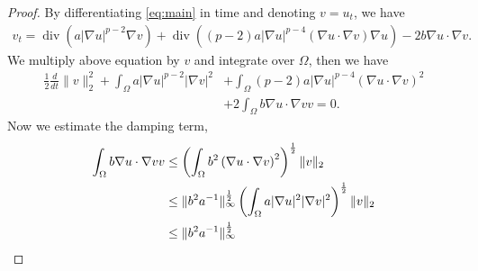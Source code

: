 \documentclass[11pt]{amsart}
\theoremstyle{definition}
\newtheorem{proofpart}{part}
\numberwithin{equation}{section}
\newcommand*\abs[1]{\lvert#1\rvert}
\newcommand*\norm[1]{\lVert#1\rVert}
\newcommand*\Brace[1]{\lbrace#1\rbrace}
\newcommand\R{\mathbb{R}}
\DeclareMathOperator{\Div}{div}
\begin{document}
\begin{proof}
	By differentiating \cref{eq:main} in time and denoting $v = u_t$, we have
	\begin{equation}
		\begin{split}
			v_t
			= \Div\left(a\abs{\nabla u}^{p-2}\nabla v\right)
			+ \Div\left(\left(p-2\right)a \abs{\nabla u}^{p-4}\left(\nabla u \cdot \nabla v\right)\nabla u\right)
			- 2b\nabla u \cdot \nabla v.
		\end{split}
	\end{equation}
	We multiply above equation by $v$ and integrate over $\Omega$, then we have
	\begin{equation}
		\begin{split}
			\frac{1}{2}\frac{d}{dt}\norm{v}_2^2
			+ \int_{\Omega}a\abs{\nabla u}^{p-2}\abs{\nabla v}^2
			&+ \int_{\Omega}\left(p-2\right)a\abs{\nabla u}^{p-4}\left(\nabla u
			\cdot \nabla v\right)^2\\
			&+ 2\int_{\Omega}b\nabla u \cdot \nabla v v
			= 0.
		\end{split}
	\end{equation}
	Now we estimate the damping term,
	\begin{equation}
		\begin{split}
			\int_{\Omega}b\nabla u \cdot \nabla v v
			&\leq \left(\int_{\Omega}b^2\left(\nabla u
			\cdot \nabla v\right)^2\right)^{\frac{1}{2}}
			\*\norm{v}_2\\
			&\leq \norm{b^2 a^{-1}}_{\infty}^{\frac{1}{2}}
			\left(\int_{\Omega}a\abs{\nabla u}^2\abs{\nabla v}^2\right)^{\frac{1}{2}}\norm{v}_2\\
			&\leq \norm{b^2 a^{-1}}_{\infty}^{\frac{1}{2}}

\end{split}
\end{equation}
\end{proof}
\end{document}
